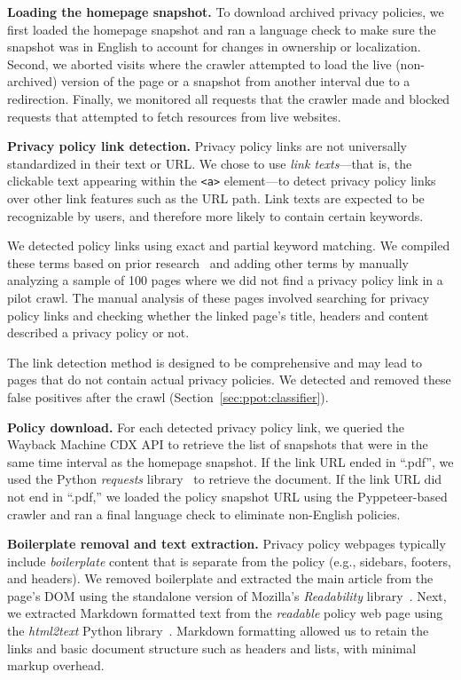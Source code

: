 {\textbf{Loading the homepage snapshot.}}
To download archived privacy policies, we first loaded the homepage snapshot and ran a language check to make sure the snapshot was in English to account for changes in ownership or localization.
Second, we aborted visits where the crawler attempted to load the live (non-archived) version of the page or a snapshot from another interval due to a redirection.
Finally, we monitored all requests that the crawler made and blocked requests that attempted to fetch resources from live websites.

{\textbf{Privacy policy link detection.}}
Privacy policy links are not universally standardized in their text or URL.
We chose to use \textit{link texts}---that is, the clickable text appearing within the \texttt{<a>} element---to detect privacy policy links over other link features such as the URL path. Link texts are expected to be recognizable by users, and therefore more likely to contain certain keywords.

We detected policy links using exact and partial keyword matching.
We compiled these terms based on prior research~\cite{libert2018automated} and adding other terms by manually analyzing a sample of 100 pages where we did not find a privacy policy link in a pilot crawl. 
The manual analysis of these pages involved searching for privacy policy links and checking whether the linked page’s title, headers and content described a privacy policy or not. 

The link detection method is designed to be comprehensive and may lead to pages that do not contain actual privacy policies.
We detected and removed these false positives after the crawl (Section~\ref{sec:ppot:classifier}).

{\textbf{Policy download.}}
For each detected privacy policy link, we queried the Wayback Machine CDX API to retrieve the list of snapshots that were in the same time interval as the homepage snapshot. 
If the link URL ended in ``.pdf'', we used the Python \textit{requests} library~\cite{PyPI-requests} to retrieve the document.
If the link URL did not end in ``.pdf,'' we loaded the policy snapshot URL using the Pyppeteer-based crawler and ran a final language check to eliminate non-English policies.

{\textbf{Boilerplate removal and text extraction.}}
Privacy policy webpages typically include \emph{boilerplate} content that is separate from the policy (e.g., sidebars, footers, and headers). 
We removed boilerplate and extracted the main article from the page's DOM using the standalone version of Mozilla’s \emph{Readability} library~\cite{readability-mozilla}. 
Next, we extracted Markdown formatted text from the \emph{readable} policy web page using the \emph{html2text} Python library~\cite{html2text-github}. Markdown formatting allowed us to retain the links and basic document structure such as headers and lists, with minimal markup overhead.

